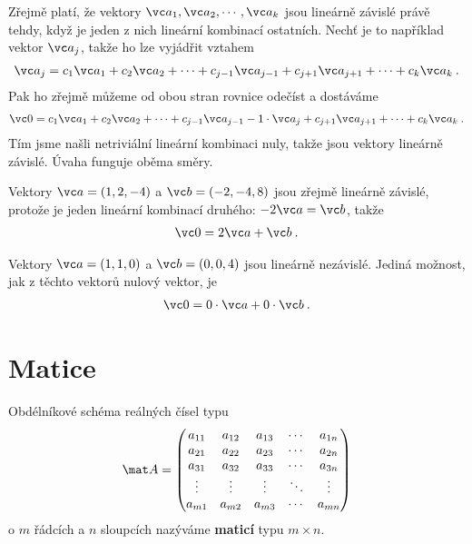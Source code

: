 Zřejmě platí, že vektory $\vc a_1, \vc a_2, \cdots, \vc a_k$ jsou lineárně závislé právě tehdy, když je jeden z nich lineární kombinací ostatních. Nechť je to například vektor $\vc a_j$, takže ho lze vyjádřit vztahem \begin{align}
    \vc a_j = c_1 \vc a_1 + c_2 \vc a_2 + \cdots + c_{j-1} \vc a_{j-1} + c_{j+1} \vc a_{j+1} + \cdots + c_k \vc a_k \:.
\end{align}
Pak ho zřejmě můžeme od obou stran rovnice odečíst a dostáváme \begin{align}
    \vc 0 = c_1 \vc a_1 + c_2 \vc a_2 + \cdots + c_{j-1} \vc a_{j-1} - 1 \cdot \vc a_j + c_{j+1} \vc a_{j+1} + \cdots + c_k \vc a_k \:.
\end{align}
Tím jsme našli netriviální lineární kombinaci nuly, takže jsou vektory lineárně závislé. Úvaha funguje oběma směry.

\begin{example}
    Vektory $\vc a = (1,2,-4)$ a $\vc b = (-2,-4,8)$ jsou zřejmě lineárně závislé, protože je jeden lineární kombinací druhého: $-2 \vc a = \vc b$, takže
    \begin{align}
        \vc 0 = 2 \vc a + \vc b  \:.
    \end{align}

    Vektory $\vc a = (1,1,0)$ a $\vc b = (0,0,4)$ jsou lineárně nezávislé. Jediná možnost, jak z těchto vektorů  nulový vektor, je \begin{align}
        \vc 0 = 0 \cdot \vc a + 0 \cdot \vc b \:.
    \end{align}
\end{example}

\section{Matice}

Obdélníkové schéma reálných čísel typu \begin{align}
    \mat A = \begin{pmatrix}
        a_{11} & a_{12} & a_{13} & \cdots & a_{1n} \\
        a_{21} & a_{22} & a_{23} & \cdots & a_{2n} \\
        a_{31} & a_{32} & a_{33} & \cdots & a_{3n} \\
        \vdots & \vdots & \vdots & \ddots & \vdots \\
        a_{m1} & a_{m2} & a_{m3} & \cdots & a_{mn} 
    \end{pmatrix}
\end{align}
o $m$ řádcích a $n$ sloupcích nazýváme \textbf{maticí} typu $m \times n$.

